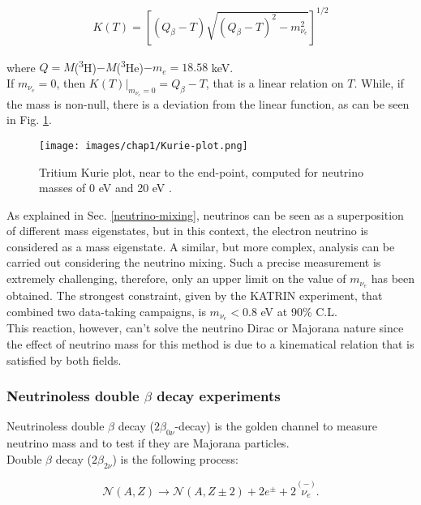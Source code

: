 \begin{equation}
\label{Kurie-eq}
    K(T) = \left[(Q_\beta - T)\sqrt{(Q_\beta - T)^2 - m^2_{\nu_e}}\right]^{1/2}
\end{equation}

where $Q = M$(\textsuperscript{3}H)$ - M$(\textsuperscript{3}He)$- m_e = 18.58$ keV. \\
If $m_{\nu_e} = 0$, then $K(T)|_{m_{\nu_e}=0} = Q_\beta - T$, that is a linear relation on $T$. While, if the mass is non-null, there is a deviation from the linear function, as can be seen in Fig. \ref{fig:Kurie-plot}.

\begin{figure}[h]
    \centering
    \texttt{[image: images/chap1/Kurie-plot.png]}
    \caption{Tritium Kurie plot, near to the end-point, computed for neutrino masses of 0 eV and 20 eV \cite{Kurie-plot}.}
    \label{fig:Kurie-plot}
\end{figure}

As explained in Sec. \ref{neutrino-mixing}, neutrinos can be seen as a superposition of different mass eigenstates, but in this context, the electron neutrino is considered as a mass eigenstate. A similar, but more complex, analysis can be carried out considering the neutrino mixing.
Such a precise measurement is extremely challenging, therefore, only an upper limit on the value of $m_{\nu_e}$ has been obtained. The strongest constraint, given by the KATRIN experiment, that combined two data-taking campaigns, is $m_{\nu_e} < 0.8$ eV at 90\% C.L. \cite{KATRIN}\\
This reaction, however, can't solve the neutrino Dirac or Majorana nature since the effect of neutrino mass for this method is due to a kinematical relation that is satisfied by both fields.

\subsubsection{Neutrinoless double $\beta$ decay experiments}
Neutrinoless double $\beta$ decay ($2\beta_{0\nu}$-decay) is the golden channel to measure neutrino mass and to test if they are Majorana particles. \\
Double $\beta$ decay ($2\beta_{2\nu}$) is the following process:

\begin{equation}
\label{double-decay}
    \mathcal{N}(A,Z) \rightarrow \mathcal{N}(A,Z \pm 2) + 2e^\pm + 2\overset{(-)}{\nu_e}.
\end{equation}

